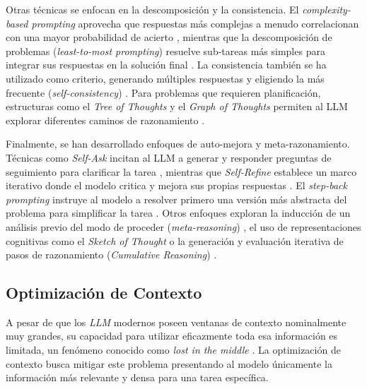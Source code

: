 Otras técnicas se enfocan en la descomposición y la consistencia. El \textit{complexity-based prompting} aprovecha que respuestas más complejas a menudo correlacionan con una mayor probabilidad de acierto \parencite{fuComplexityBasedPromptingMultiStep2023}, mientras que la descomposición de problemas (\textit{least-to-most prompting}) resuelve sub-tareas más simples para integrar sus respuestas en la solución final \parencite{zhouLeasttoMostPromptingEnables2023}. La consistencia también se ha utilizado como criterio, generando múltiples respuestas y eligiendo la más frecuente (\textit{self-consistency}) \parencite{wangSelfConsistencyImprovesChain2023}. Para problemas que requieren planificación, estructuras como el \textit{Tree of Thoughts} y el \textit{Graph of Thoughts} permiten al LLM explorar diferentes caminos de razonamiento \parencite{yaoTreeThoughtsDeliberate2023, bestaGraphThoughtsSolving2024}.

Finalmente, se han desarrollado enfoques de auto-mejora y meta-razonamiento. Técnicas como \textit{Self-Ask} incitan al LLM a generar y responder preguntas de seguimiento para clarificar la tarea \parencite{pressMeasuringNarrowingCompositionality2023}, mientras que \textit{Self-Refine} establece un marco iterativo donde el modelo critica y mejora sus propias respuestas \parencite{madaanSelfRefineIterativeRefinement2023}. El \textit{step-back prompting} instruye al modelo a resolver primero una versión más abstracta del problema para simplificar la tarea \parencite{zhengTakeStepBack2024}. Otros enfoques exploran la inducción de un análisis previo del modo de proceder (\textit{meta-reasoning}) \parencite{gaoMetaReasoningLarge2024}, el uso de representaciones cognitivas como el \textit{Sketch of Thought} \parencite{aytesSketchofThoughtEfficientLLM2025} o la generación y evaluación iterativa de pasos de razonamiento (\textit{Cumulative Reasoning}) \parencite{zhangCumulativeReasoningLarge2025}.

\subsection{Optimización de Contexto}
\label{subsec:context_optimization}
A pesar de que los \textit{LLM} modernos poseen ventanas de contexto nominalmente muy grandes, su capacidad para utilizar eficazmente toda esa información es limitada, un fenómeno conocido como \textit{lost in the middle} \parencite{liuLostMiddleHow2024}. La optimización de contexto busca mitigar este problema presentando al modelo únicamente la información más relevante y densa para una tarea específica.

